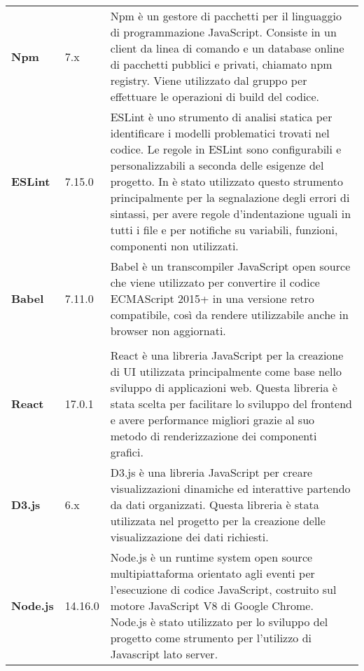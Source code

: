 {\begin{longtable}{C{3cm} C{2cm} C{10cm}}
 	\textbf{Npm} & 
	7.x &
	Npm è un gestore di pacchetti per il linguaggio di programmazione JavaScript. Consiste in un client da linea di comando e un database online di pacchetti pubblici e privati, chiamato npm registry. Viene utilizzato dal gruppo per effettuare le operazioni di build del codice. \\
 
 \textbf{ESLint} & 
	7.15.0  &
	ESLint è uno strumento di analisi statica per identificare i modelli problematici trovati nel codice. Le regole in ESLint sono configurabili e personalizzabili a seconda delle esigenze del progetto.
In \NomeProgetto{} è stato utilizzato questo strumento principalmente per la segnalazione degli errori di sintassi, per avere regole  d'indentazione uguali in tutti i file e per notifiche su variabili, funzioni, componenti non utilizzati. \\
 
	\textbf{Babel} & 
	7.11.0 &
	Babel è un transcompiler JavaScript open source che viene utilizzato per convertire il codice ECMAScript 2015+ in una versione retro compatibile, così da rendere \NomeProgetto{} utilizzabile anche in browser non aggiornati. \\
  
\\
 
	\textbf{React} & 
	17.0.1 &
	React è una libreria JavaScript per la creazione di UI utilizzata principalmente come base nello sviluppo di applicazioni web.
Questa libreria è stata scelta per facilitare lo sviluppo del frontend e avere performance migliori grazie al suo metodo di renderizzazione dei componenti grafici.\\ 
 
 	\textbf{D3.js} & 
	6.x &
	D3.js è una libreria JavaScript per creare visualizzazioni dinamiche ed interattive partendo da dati organizzati.
Questa libreria è stata utilizzata nel progetto \NomeProgetto{} per la creazione delle visualizzazione dei dati richiesti.\\

	\textbf{Node.js} & 
	14.16.0 &
	Node.js è un runtime system open source multipiattaforma orientato agli eventi per l'esecuzione di codice JavaScript, costruito sul motore JavaScript V8 di Google Chrome.
Node.js è stato utilizzato per lo sviluppo del progetto \NomeProgetto{} come strumento per l'utilizzo di Javascript lato server.\\
 

\end{longtable}}
